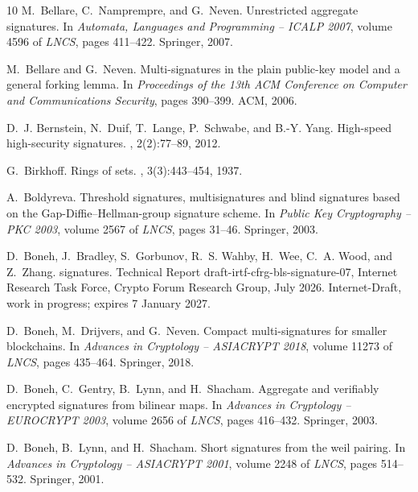 \documentclass[11pt]{article}
\theoremstyle{definition}
\begin{document}
\begin{thebibliography}{10}
M.~Bellare, C.~Namprempre, and G.~Neven.
\newblock Unrestricted aggregate signatures.
\newblock In {\em Automata, Languages and Programming -- ICALP 2007}, volume
  4596 of {\em LNCS}, pages 411--422. Springer, 2007.

M.~Bellare and G.~Neven.
\newblock Multi-signatures in the plain public-key model and a general forking
  lemma.
\newblock In {\em Proceedings of the 13th ACM Conference on Computer and
  Communications Security}, pages 390--399. ACM, 2006.

D.~J. Bernstein, N.~Duif, T.~Lange, P.~Schwabe, and B.-Y. Yang.
\newblock High-speed high-security signatures.
, 2(2):77--89, 2012.

G.~Birkhoff.
\newblock Rings of sets.
, 3(3):443--454, 1937.

A.~Boldyreva.
\newblock Threshold signatures, multisignatures and blind signatures based on
  the {Gap-Diffie--Hellman}-group signature scheme.
\newblock In {\em Public Key Cryptography -- PKC 2003}, volume 2567 of {\em
  LNCS}, pages 31--46. Springer, 2003.

D.~Boneh, J.~Bradley, S.~Gorbunov, R.~S. Wahby, H.~Wee, C.~A. Wood, and
  Z.~Zhang.
 signatures.
\newblock Technical Report draft-irtf-cfrg-bls-signature-07, Internet Research
  Task Force, Crypto Forum Research Group, July 2026.
\newblock Internet-Draft, work in progress; expires 7 January 2027.

D.~Boneh, M.~Drijvers, and G.~Neven.
\newblock Compact multi-signatures for smaller blockchains.
\newblock In {\em Advances in Cryptology -- ASIACRYPT 2018}, volume 11273 of
  {\em LNCS}, pages 435--464. Springer, 2018.

D.~Boneh, C.~Gentry, B.~Lynn, and H.~Shacham.
\newblock Aggregate and verifiably encrypted signatures from bilinear maps.
\newblock In {\em Advances in Cryptology -- EUROCRYPT 2003}, volume 2656 of
  {\em LNCS}, pages 416--432. Springer, 2003.

D.~Boneh, B.~Lynn, and H.~Shacham.
\newblock Short signatures from the weil pairing.
\newblock In {\em Advances in Cryptology -- ASIACRYPT 2001}, volume 2248 of
  {\em LNCS}, pages 514--532. Springer, 2001.


\end{thebibliography}
\end{document}
